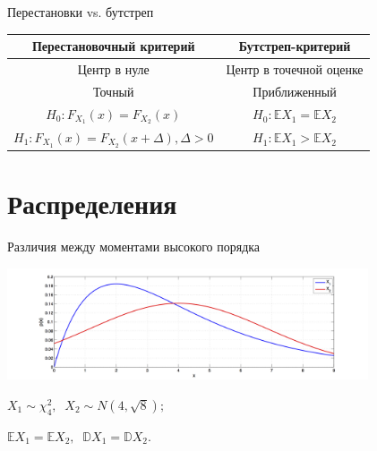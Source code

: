 \documentclass[11pt,pdf,utf8,hyperref={unicode},aspectratio=169]{beamer}
\begin{document}
\begin{frame}{Перестановки vs. бутстреп}
    \centering
    \begin{tabular}{|c|c|}
    \hline
    \bf Перестановочный критерий & \bf Бутстреп-критерий\\
    \hline
    Центр в нуле & Центр в точечной оценке \\ \hline
    Точный & Приближенный \\ \hline
    $H_0\colon F_{X_1}(x) = F_{X_2}(x)$ & $H_0\colon \mathbb{E}X_1 = \mathbb{E}X_2$ \\
    $H_1\colon F_{X_1}(x) = F_{X_2}(x+\Delta), \Delta>0$ & $H_1\colon \mathbb{E}X_1 > \mathbb{E}X_2$\\\hline
    \end{tabular}

\end{frame}



\section{Распределения}

\begin{frame}{Различия между моментами высокого порядка}
 \begin{center}
     \includegraphics[width=0.8\textwidth,trim=30mm 0mm 30mm 5mm,clip]{distrdiff_example.png}
 \end{center}

 $X_1\sim \chi^2_4, \;\; X_2\sim N\left(4,\sqrt{8}\right);$

 $\mathbb{E}X_1=\mathbb{E}X_2, \;\; \mathbb{D}X_1 = \mathbb{D}X_2.$
\end{frame}
\end{document}
